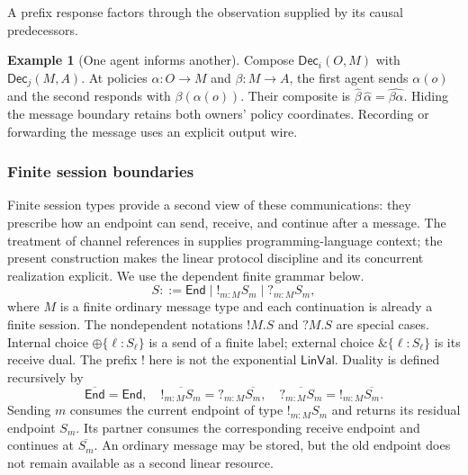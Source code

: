 \documentclass[11pt,a4paper]{article}
\numberwithin{equation}{section}
\theoremstyle{definition}
\newtheorem{example}[theorem]{Example}
\theoremstyle{remark}
\theoremstyle{plain}
\providecommand{\Dec}{\mathsf{Dec}}
\providecommand{\Lin}{\mathsf{Lin}}
\providecommand{\Val}{\mathsf{Val}}
\providecommand{\End}{\mathsf{End}}
\begin{document}
\noindent A prefix response factors through the observation supplied by its causal predecessors.
\begin{center}
\end{center}

\begin{example}[One agent informs another]
Compose $\Dec_i(O,M)$ with $\Dec_j(M,A)$. At policies
$\alpha:O\to M$ and $\beta:M\to A$, the first agent sends $\alpha(o)$
and the second responds with $\beta(\alpha(o))$. Their composite is
$\widehat\beta\,\widehat\alpha=\widehat{\beta\alpha}$.
Hiding the message boundary retains both owners' policy coordinates.
Recording or forwarding the message uses an explicit output wire.
\end{example}

\subsubsection{Finite session boundaries}

Finite session types provide a second view of these communications:
they prescribe how an endpoint can send, receive, and continue after a
message. The treatment of channel references in \citet{agt-Harper} supplies programming-language context; the present
construction makes the linear protocol discipline and its concurrent
realization explicit. We use the dependent finite grammar below.
\begin{equation}
 S::=\End\mid !_{m:M}S_m\mid ?_{m:M}S_m,
 \label{agt-eq-session-grammar}
\end{equation}
where $M$ is a finite ordinary message type and each continuation is already
a finite session. The nondependent notations $!M.S$ and $?M.S$ are special
cases. Internal choice $\oplus\{\ell:S_\ell\}$ is a send of a finite label;
external choice $\&\{\ell:S_\ell\}$ is its receive dual. The prefix $!$
here is not the exponential $\Lin\Val$. Duality is defined recursively by
\[
 \overline{\End}=\End,\quad
 \overline{!_{m:M}S_m}=?_{m:M}\overline{S_m},\quad
 \overline{?_{m:M}S_m}=!_{m:M}\overline{S_m}.
\]
Sending $m$ consumes the current endpoint of type
$!_{m:M}S_m$ and returns its residual endpoint $S_m$.
Its partner consumes the corresponding receive endpoint and continues
at $\overline{S_m}$. An ordinary message may be stored, but the old
endpoint does not remain available as a second linear resource.
\end{document}

